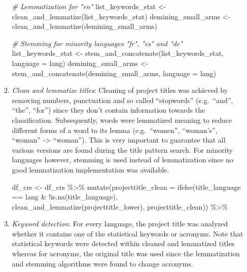 \documentclass[
]{article}
\newenvironment{Shaded}{\begin{snugshade}}{\end{snugshade}}
\newcommand{\AttributeTok}[1]{\textcolor[rgb]{0.77,0.63,0.00}{#1}}
\newcommand{\CommentTok}[1]{\textcolor[rgb]{0.56,0.35,0.01}{\textit{#1}}}
\newcommand{\FunctionTok}[1]{\textcolor[rgb]{0.00,0.00,0.00}{#1}}
\newcommand{\NormalTok}[1]{#1}
\newcommand{\OtherTok}[1]{\textcolor[rgb]{0.56,0.35,0.01}{#1}}
\newcommand{\SpecialCharTok}[1]{\textcolor[rgb]{0.00,0.00,0.00}{#1}}
\begin{document}
\begin{enumerate}
\begin{enumerate}
\begin{Shaded}
\begin{Highlighting}[]
\CommentTok{\# Lemmatization for "en"}
\NormalTok{list\_keywords\_stat }\OtherTok{\textless{}{-}} \FunctionTok{clean\_and\_lemmatize}\NormalTok{(list\_keywords\_stat)}
\NormalTok{demining\_small\_arms }\OtherTok{\textless{}{-}} \FunctionTok{clean\_and\_lemmatize}\NormalTok{(demining\_small\_arms)}

\CommentTok{\# Stemming for minority languages "fr", "es" and "de"}
\NormalTok{list\_keywords\_stat }\OtherTok{\textless{}{-}} \FunctionTok{stem\_and\_concatenate}\NormalTok{(list\_keywords\_stat, }\AttributeTok{language =}\NormalTok{ lang)}
\NormalTok{demining\_small\_arms }\OtherTok{\textless{}{-}} \FunctionTok{stem\_and\_concatenate}\NormalTok{(demining\_small\_arms, }\AttributeTok{language =}\NormalTok{ lang)}
\end{Highlighting}
\end{Shaded}
  \item
    \emph{Clean and lemmatize titles}: Cleaning of project titles was achieved by removing numbers, punctuation and so called ``stopwords'' (e.g.~``and'', ``the'', ``for'') since they don't contain information towards the classification. Subsequently, words were lemmatized meaning to reduce different forms of a word to its lemma (e.g.~``women'', ``woman's'', ``woman'' -\textgreater{} ``woman''). This is very important to guarantee that all various versions are found during the title pattern search. For minority languages however, stemming is used instead of lemmatization since no good lemmatization implementation was available.

\begin{Shaded}
\begin{Highlighting}[]
\NormalTok{df\_crs }\OtherTok{\textless{}{-}}\NormalTok{ df\_crs }\SpecialCharTok{\%\textgreater{}\%}
  \FunctionTok{mutate}\NormalTok{(}\AttributeTok{projecttitle\_clean =} \FunctionTok{ifelse}\NormalTok{(title\_language }\SpecialCharTok{==}\NormalTok{ lang }\SpecialCharTok{\&} \SpecialCharTok{!}\FunctionTok{is.na}\NormalTok{(title\_language), }
                                     \FunctionTok{clean\_and\_lemmatize}\NormalTok{(projecttitle\_lower),}
\NormalTok{                                     projecttitle\_clean)) }\SpecialCharTok{\%\textgreater{}\%}        
\end{Highlighting}
\end{Shaded}
  \item
    \emph{Keyword detection}: For every language, the project title was analyzed whether it contains one of the statistical keywords or acronyms. Note that statistical keywords were detected within cleaned and lemmatized titles whereas for acronyms, the original title was used since the lemmatization and stemming algorithms were found to change acronyms.


\end{enumerate}
\end{enumerate}
\end{document}
